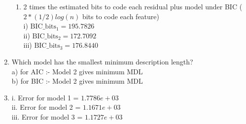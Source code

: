\documentclass[english]{article}
\begin{document}
\begin{enumerate}
\begin{enumerate}
\item 2 times the estimated bits to code each residual plus model under BIC  ($2*(1/2) log(n)$ bits to code each feature) \\
i)   $\text{BIC}\_\text{bits}_1 = 195.7826$ \\
ii)  $\text{BIC}\_\text{bits}_2 = 172.7092$ \\
iii) $\text{BIC}\_\text{bits}_3 = 176.8440$ \\

\end{enumerate}

\item Which model has the smallest minimum description length? \\
a) for AIC :- Model 2 gives minimum MDL\\
b) for BIC :- Model 2 gives minimum MDL\\

\item  
i. Error for model 1 = $1.7786e+03$ \\
ii. Error for model 2 = $1.1671e+03$ \\
iii. Error for model 3 = $1.1727e+03$ \\

\end{enumerate}
\end{document}
